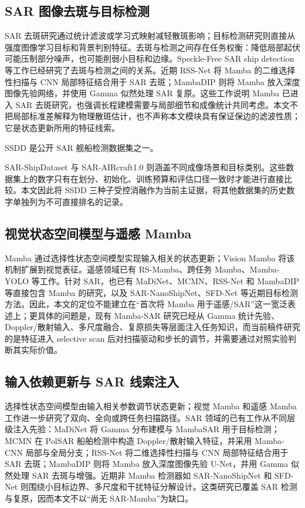 \documentclass[UTF8,12pt,a4paper]{ctexart}
\begin{document}
\subsection{SAR 图像去斑与目标检测}
SAR 去斑研究通过统计滤波或学习式映射减轻散斑影响；目标检测研究则直接从强度图像学习目标和背景判别特征。去斑与检测之间存在任务权衡：降低局部起伏可能压制部分噪声，也可能削弱小目标和边缘。Speckle-Free SAR ship detection 等工作已经研究了去斑与检测之间的关系\cite{specklefree}。近期 RSS-Net 将 Mamba 的二维选择性扫描与 CNN 局部特征结合用于 SAR 去斑；MambaDIP 则将 Mamba 放入深度图像先验网络，并使用 Gamma 似然处理 SAR 复原\cite{rssnet,mambadip}。这些工作说明 Mamba 已进入 SAR 去斑研究，也强调长程建模需要与局部细节和成像统计共同考虑。本文不把局部标准差解释为物理散斑估计，也不声称本文模块具有保证保边的滤波性质；它是状态更新所用的特征线索。

SSDD 是公开 SAR 舰船检测数据集之一\cite{ssdd2017,ssdd2021}。

SAR-ShipDataset 与 SAR-AIRcraft1.0 则涵盖不同成像场景和目标类别\cite{sardataset,saraircraft}。这些数据集上的数字只有在划分、初始化、训练预算和评估口径一致时才能进行直接比较。本文因此将 SSDD 三种子受控消融作为当前主证据，将其他数据集的历史数字单独列为不可直接排名的记录。

\subsection{视觉状态空间模型与遥感 Mamba}
Mamba 通过选择性状态空间模型实现输入相关的状态更新\cite{gu2023mamba}；Vision Mamba 将该机制扩展到视觉表征\cite{liu2024visionmamba}。遥感领域已有 RS-Mamba、跨任务 Mamba、Mamba-YOLO 等工作\cite{rs_mamba,rstmtmamba,mambayolo}。针对 SAR，也已有 MaDiNet、MCMN、RSS-Net 和 MambaDIP 等直接包含 Mamba 的研究，以及 SAR-NanoShipNet、SFD-Net 等近期目标检测方法\cite{madinet,mcmn,rssnet,mambadip,sarnano,sfdnet}。因此，本文的定位不能建立在“首次将 Mamba 用于遥感/SAR”这一宽泛表述上；更具体的问题是，现有 Mamba-SAR 研究已经从 Gamma 统计先验、Doppler/散射输入、多尺度融合、复原损失等层面注入任务知识，而当前稿件研究的是特征进入 selective scan 后对扫描驱动和步长的调节，并需要通过对照实验判断其实际价值。

\subsection{输入依赖更新与 SAR 线索注入}
选择性状态空间模型由输入相关参数调节状态更新；视觉 Mamba 和遥感 Mamba 工作进一步研究了双向、全向或跨任务扫描路径\cite{gu2023mamba,liu2024visionmamba,rs_mamba,rstmtmamba}。SAR 领域的已有工作从不同层级注入先验：MaDiNet 将 Gamma 分布建模与 MambaSAR 用于目标检测；MCMN 在 PolSAR 船舶检测中构造 Doppler/散射输入特征，并采用 Mamba-CNN 局部与全局分支；RSS-Net 将二维选择性扫描与 CNN 局部特征结合用于 SAR 去斑；MambaDIP 则将 Mamba 放入深度图像先验 U-Net，并用 Gamma 似然处理 SAR 去斑与增强\cite{madinet,mcmn,rssnet,mambadip}。近期非 Mamba 检测器如 SAR-NanoShipNet 和 SFD-Net 则围绕小目标边界、多尺度和干扰特征分解设计\cite{sarnano,sfdnet}。这类研究已覆盖 SAR 检测与复原，因而本文不以“尚无 SAR-Mamba”为缺口。
\end{document}

